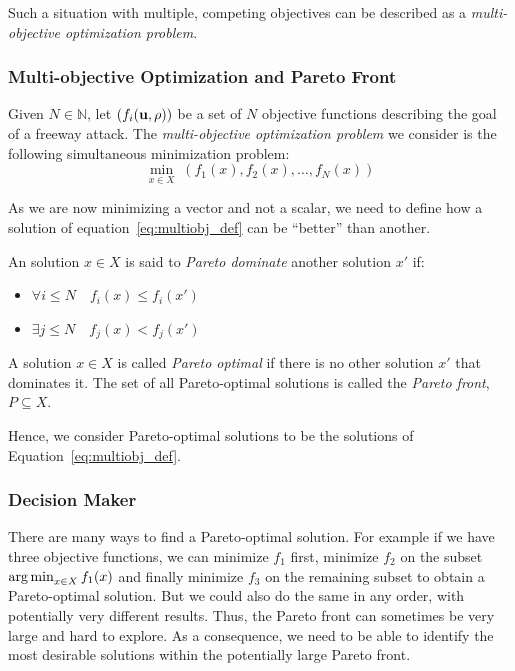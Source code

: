 		Such a situation with multiple, competing objectives can be described as a \emph{multi-objective optimization problem}.

		\subsubsection{Multi-objective Optimization and Pareto Front}
			\begin{definition}
			Given $N \in \mathbb{N}$, let $ ( f_i\left(\vectorize{u}, \vectorize{\rho}\right))$ be a set of $N$ objective functions describing the goal of a freeway attack. The \emph{multi-objective optimization problem} we consider is the following simultaneous minimization problem:
				\begin{equation}\label{eq:multiobj_def}
						\min_{x\in X} \; \left(f_1(x), f_2(x),\ldots, f_N(x) \right)
				\end{equation}
			\end{definition}
			As we are now minimizing a vector and not a scalar, we need to define how a solution of equation~\eqref{eq:multiobj_def} can be ``better'' than another.

			\begin{definition}\label{def:paretofront}
			An solution $x \in X$ is said to \emph{Pareto dominate} another solution $x'$ if:
				\begin{itemize}
						\item $\forall i \leq N \quad f_i(x) \leq f_i(x')$
						\item $\exists j \leq N \quad f_j(x) < f_j(x')$
				\end{itemize}
			A solution $x \in X$ is called \emph{Pareto optimal} if there is no other solution $x'$ that dominates it. The set of all Pareto-optimal solutions is called the \emph{Pareto front}, $P \subseteq X$.
			\end{definition}

			Hence, we consider Pareto-optimal solutions to be the solutions of Equation~\eqref{eq:multiobj_def}.

			\subsubsection{Decision Maker}
			There are many ways to find a Pareto-optimal solution. For example if we have three objective functions, we can minimize $f_1$ first, minimize $f_2$ on the subset $\operatorname*{arg\,min}_{x \in X} f_1(x)$ and finally minimize $f_3$ on the remaining subset to obtain a Pareto-optimal solution. But we could also do the same in any order, with potentially very different results. Thus, the Pareto front can sometimes be very large and hard to explore. As a consequence, we need to be able to identify the most desirable solutions within the potentially large Pareto front.

